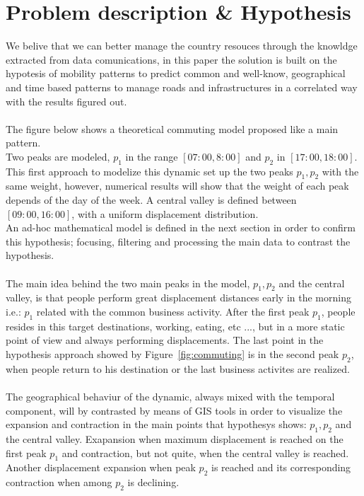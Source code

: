 \newpage

\section{Problem description \& Hypothesis}
We belive that we can better manage  the country resouces through the knowldge extracted from data comunications, in this paper the solution is built on the hypotesis of mobility patterns to predict common and well-know, geographical and time based patterns to manage roads and infrastructures in a correlated way with the results figured out.
\\
\\
The figure below shows a theoretical commuting model proposed like a main pattern. 
\\
Two peaks are modeled, $p_1$ in the range $[07:00,8:00]$ and $p_2$ in $[17:00,18:00]$. This first approach to modelize this dynamic set up the two peaks $p_1, p_2$ with the same weight, however, numerical results will show that the weight of each peak depends of the day of the week. A central valley is defined between $[09:00, 16:00]$, with a uniform displacement distribution.
\\
An ad-hoc mathematical model is defined in the next section in order to confirm this hypothesis; focusing, filtering and processing the main data to contrast the hypothesis.
\\
\\
The main idea behind the two main peaks in the model, $p_1, p_2$ and the central valley, is that people perform great displacement distances early in the morning i.e.: $p_1$ related with the common business activity. After the first peak $p_1$, people resides in this target destinations, working, eating, etc ..., but in a more static point of view and always performing displacements. The last point in the hypothesis approach showed by Figure~\ref{fig:commuting} is in the second peak $p_2$, when people return to his destination or the last business activites are realized.
\\
\\
The geographical behaviur of the dynamic, always mixed with the temporal component, will by contrasted by means of GIS tools in order to visualize the expansion and contraction in the main points that hypothesys shows: $p_1, p_2$ and the central valley. Exapansion when maximum displacement is reached on the first peak $p_1$ and contraction, but not quite,  when the central valley is reached. Another displacement expansion when peak $p_2$ is reached and its corresponding contraction when among $p_2$ is declining.


